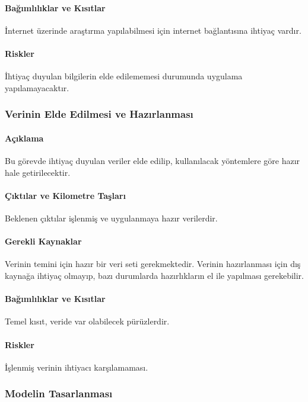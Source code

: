 \documentclass[12pt,a4paper]{article}
\begin{document}
   \paragraph{Bağımlılıklar ve Kısıtlar}
   İnternet üzerinde araştırma yapılabilmesi için internet bağlantısına ihtiyaç vardır.

   \paragraph{Riskler}
   İhtiyaç duyulan bilgilerin elde edilememesi durumunda uygulama yapılamayacaktır.


   \subsubsection{Verinin Elde Edilmesi ve Hazırlanması}
   \paragraph{Açıklama}
   Bu görevde ihtiyaç duyulan veriler elde edilip, kullanılacak yöntemlere göre hazır hale getirilecektir.

   \paragraph{Çıktılar ve Kilometre Taşları}
   Beklenen çıktılar işlenmiş ve uygulanmaya hazır verilerdir.

   \paragraph{Gerekli Kaynaklar}
   Verinin temini için hazır bir veri seti gerekmektedir. Verinin hazırlanması için dış kaynağa ihtiyaç olmayıp, bazı durumlarda hazırlıkların el ile yapılması gerekebilir.

   \paragraph{Bağımlılıklar ve Kısıtlar}
   Temel kısıt, veride var olabilecek pürüzlerdir.

   \paragraph{Riskler}
   İşlenmiş verinin ihtiyacı karşılamaması.


   \subsubsection{Modelin Tasarlanması}
\end{document}
